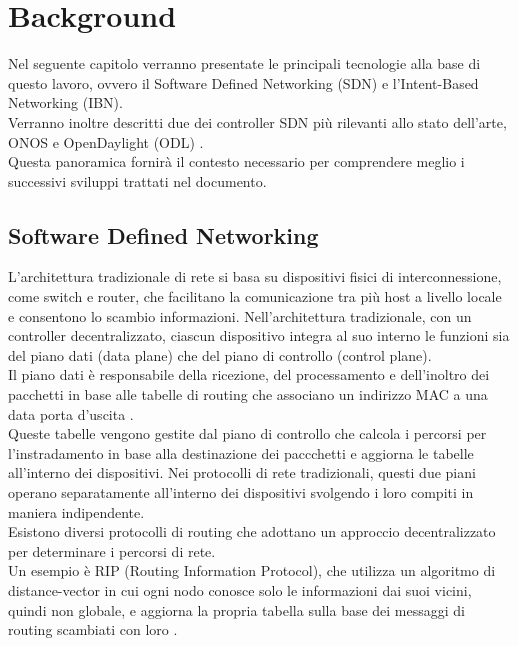 \chapter{Background}
\label{cap:contesto}
Nel seguente capitolo verranno presentate le principali tecnologie alla base di questo lavoro, ovvero il Software Defined Networking (SDN) e l'Intent-Based Networking (IBN). 
\\Verranno inoltre descritti due dei controller SDN più rilevanti allo stato dell'arte, ONOS \cite{ONOS} e OpenDaylight (ODL) \cite{ODL}. 
\\Questa panoramica fornirà il contesto necessario per comprendere meglio i successivi sviluppi trattati nel documento.
\section{Software Defined Networking}
\label{ch:SDN}
L'architettura tradizionale di rete si basa su dispositivi fisici di interconnessione, come switch e router, che facilitano la comunicazione tra più host a livello locale e consentono lo scambio informazioni.
Nell'architettura tradizionale, con un controller decentralizzato, ciascun dispositivo integra al suo interno le funzioni sia del piano dati (data plane) che del piano di controllo (control plane). 
\\Il piano dati è responsabile della ricezione, del processamento e dell'inoltro dei pacchetti in base alle tabelle di routing che associano un indirizzo MAC a una data porta d'uscita \cite{tesiSDN:2020}. 
\\Queste tabelle vengono gestite dal piano di controllo che calcola i percorsi 
per l'instradamento in base alla destinazione dei paccchetti e aggiorna le tabelle all'interno dei dispositivi. 
Nei protocolli di rete tradizionali, questi due piani operano separatamente all'interno dei dispositivi svolgendo i loro compiti in maniera indipendente. 
\\Esistono diversi protocolli di routing che adottano un approccio decentralizzato per determinare i percorsi di rete.
\\Un esempio è RIP (Routing Information Protocol), che utilizza un algoritmo di distance-vector in cui ogni nodo conosce solo le informazioni dai suoi vicini, quindi non globale, e aggiorna la propria tabella sulla base dei messaggi di routing scambiati con loro \cite{rip}.
